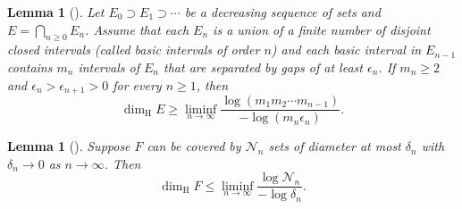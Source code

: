 \documentclass[12pt,reqno]{amsart}
\renewcommand{\=}{\coloneqq}
\theoremstyle{plain}
\newtheorem{lemma}[theorem]{Lemma}
\begin{document}
\begin{lemma}[{\cite[Example 4.6]{Fal}}]\label{l.lowerbound}
        Let $E_0\supset E _1\supset\cdots $ be a decreasing sequence of sets and $E=\bigcap_{n\geq 0}E_n$. Assume that each $E_n$ is a union of a finite number of disjoint closed intervals (called basic intervals of order $n$) and each basic interval in $E_{n-1}$ contains $m_n$ intervals of $E_n$ that are separated by gaps of at least $\epsilon_n$. If $m_n\geq 2$ and $\epsilon_{n}>\epsilon_{n+1}>0$ for every $n\geq 1$, then
        \begin{equation}\label{e.lemma_lower_bound}
                \dim_{\mathrm{H}}E\geq
                \liminf_{n\to \infty}
                \frac{\log(m_1m_2\cdots m_{n-1})}
                {-\log(m_n\epsilon_n)}.
        \end{equation}
\end{lemma}
\begin{lemma}[{\cite[Proposition 4.1]{Fal}}]\label{l.upperbound}
        Suppose $F$ can be
covered by $\mathcal{N}_n$ sets of diameter at most $\delta_n$
        with $\delta_n\rightarrow 0$
        as $n\rightarrow \infty$.
        Then
        \begin{equation*}
                \dim_{\mathrm{H}}F
                \leq \liminf_{n\to \infty}
                \frac{\log\mathcal{N}_n}{-\log\delta_n}.
        \end{equation*}
\end{lemma}
\end{document}

